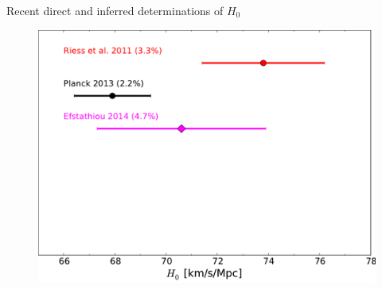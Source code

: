 \documentclass{beamer}
\begin{document}
\begin{frame}{Recent direct and inferred determinations of $H_0$}
{\begin{figure}[hbtp]
\includegraphics[width=\textwidth]{../figures/chapter-h0/H0_history-3.pdf}
\end{figure}
}
\end{frame}
\end{document}
